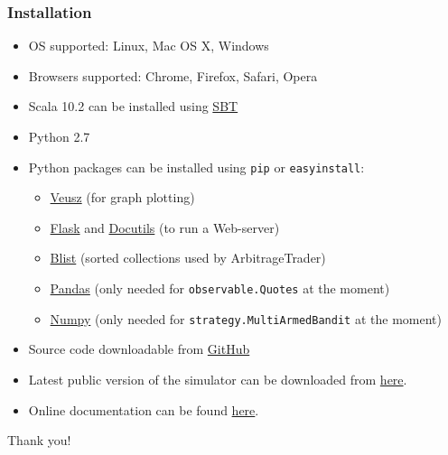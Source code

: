 \documentclass{beamer}
\begin{document}
\begin{frame}
\frametitle{Installation}
\begin{itemize}
\item OS supported: Linux, Mac OS X, Windows
\item Browsers supported: Chrome, Firefox, Safari, Opera
\item Scala 10.2 can be installed using \textcolor[rgb]{0.00,0.50,0.75}{\href{http://www.scala-sbt.org/release/docs/Getting-Started/Setup.html}{SBT}}
\item Python 2.7  
\item Python packages can be installed using \texttt{pip} or \texttt{easyinstall}:
\begin{itemize}
\item \textcolor[rgb]{0.00,0.50,0.75}{\href{http://home.gna.org/veusz/}{Veusz}} (for graph plotting)
\item \textcolor[rgb]{0.00,0.50,0.75}{\href{http://flask.pocoo.org}{Flask}} and \textcolor[rgb]{0.00,0.50,0.75}{\href{https://pypi.python.org/pypi/docutils}{Docutils}} (to run a Web-server)
\item \textcolor[rgb]{0.00,0.50,0.75}{\href{https://pypi.python.org/pypi/blist/}{Blist}} (sorted collections used by ArbitrageTrader)
\item \textcolor[rgb]{0.00,0.50,0.75}{\href{http://pandas.pydata.org/}{Pandas}} (only needed for \texttt{observable.Quotes} at the moment)
\item \textcolor[rgb]{0.00,0.50,0.75}{\href{https://pypi.python.org/pypi/numpy}{Numpy}} (only needed for \texttt{strategy.MultiArmedBandit} at the moment)
\end{itemize}
\item Source code downloadable from \textcolor[rgb]{0.00,0.50,0.75}{\href{https://github.com/fiquant/marketsimulator}{GitHub}}
\item Latest public version of the simulator can be downloaded from \textcolor[rgb]{0.00,0.50,0.75}{\href{https://github.com/fiquant/marketsimulator/releases}{here}}.
\item Online documentation can be found \textcolor[rgb]{0.00,0.50,0.75}{\href{https://github.com/fiquant/marketsimulator/blob/master/README.rst}{here}}.
\end{itemize}

\end{frame}

\begin{frame}
\Huge{\centerline{Thank you!}}
\end{frame}

\end{document}
